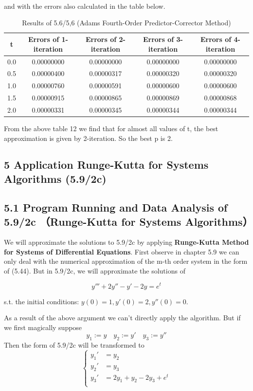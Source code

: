 \documentclass{article}
\begin{document}
    and with the errors also calculated in the table below.

    \begin{table}[htbp]
    \centering
    \caption{Results of 5.6/5,6 (Adams Fourth-Order Predictor-Corrector Method)}
    \begin{tabular}{c|c|c|c|c}
    \toprule
    t & \textbf{Errors of 1-iteration} & \textbf{Errors of 2-iteration} & \textbf{Errors of 3-iteration} & \textbf{Errors of 4-iteration}\\ 
    \midrule
    0.0 & 0.00000000  & 0.00000000 & 0.00000000  & 0.00000000 \\
    0.5 & 0.00000400  & 0.00000317 & 0.00000320  & 0.00000320 \\
    1.0 & 0.00000760  & 0.00000591 & 0.00000600  & 0.00000600 \\
    1.5 & 0.00000915  & 0.00000865 & 0.00000869  & 0.00000868 \\
    2.0 & 0.00000331  & 0.00000345 & 0.00000344  & 0.00000344 \\
    \bottomrule
    \end{tabular}
    \end{table}

    From the above table 12 we find that for almost all values of t, the best approximation is given by 2-iteration. So the best p is 2. 


\newpage
\subsection{5 Application Runge-Kutta for Systems Algorithms (5.9/2c)}
    \subsection{5.1 Program Running and Data Analysis of 5.9/2c （Runge-Kutta for Systems Algorithms）}
    We will approximate the solutions to 5.9/2c by applying \textbf{Runge-Kutta Method for Systems of Differential Equations}. First observe in chapter 5.9 we can only deal with the numerical approximation of the m-th order system in the form of (5.44). But in 5.9/2c, we will approximate the solutions of

    $$y'''+2y''-y'-2y=e^t    
    $$

    s.t. the initial conditions: $y(0)=1,y'(0)=2,y''(0)=0$.


    As a result of the above argument we can't directly apply the algorithm. But if we first magically suppose
    $$ y_1:=y \quad y_2:=y' \quad y_3:=y''
    $$
    Then the form of 5.9/2c will be transformed to
    \begin{equation}
    \left\{
    \begin{aligned}
    y_{1}'&=y_2\\
    y_{2}'&=y_3\\ 
    y_{3}'&=2y_{1}+y_{2}-2y_{3}+e^{t}\\  
    \end{aligned}
    \right.
    \end{equation}
\end{document}
